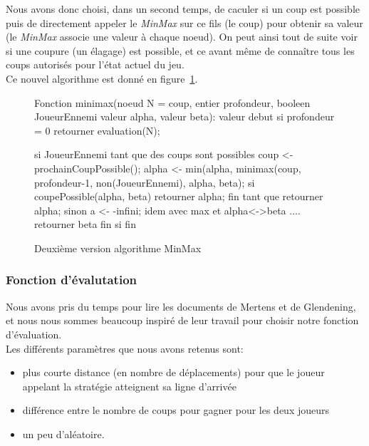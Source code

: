 \documentclass[12pt,a4paper]{article}
\begin{document}
Nous avons donc choisi, dans un second temps, de caculer si un coup est possible puis de directement appeler le 
\textit{MinMax} sur ce \og fils \fg{} (le coup) pour obtenir sa valeur (le \textit{MinMax} associe une 
valeur à chaque noeud). On peut ainsi tout de suite voir si une coupure (un élagage) 
est possible, et ce avant même de conna\^itre tous les coups autorisés pour l'état 
actuel du jeu. 
\\

Ce nouvel algorithme est donné en figure~\ref{algo2}.

\newpage
\begin{figure}[h]
\begin{verbatimtab}[2]
Fonction minimax(noeud N = coup, entier profondeur, booleen JoueurEnnemi
valeur alpha, valeur beta): valeur
debut
	si profondeur = 0
		retourner evaluation(N);

	si JoueurEnnemi
		tant que des coups sont possibles
			coup <- prochainCoupPossible();
			alpha <- min(alpha, minimax(coup, profondeur-1, non(JoueurEnnemi),
						alpha, beta);
			si coupePossible(alpha, beta)
				retourner alpha;
		fin tant que
		retourner alpha;
	sinon
		a <- -infini;
		idem avec max et alpha<->beta ....
		retourner beta
	fin si
fin
  \end{verbatimtab}
  \caption{Deuxième version algorithme MinMax}
  \label{algo2}
\end{figure}

\subsubsection{Fonction d'évalutation}

Nous avons pris du temps pour lire les documents de Mertens et de Glendening, et nous
nous sommes beaucoup inspiré de leur travail pour choisir notre fonction d'évaluation. 
\\
 
Les différents paramètres que nous avons retenus sont:
\begin{itemize}
  \item plus courte distance (en nombre de déplacements) pour que le joueur 
    appelant la stratégie atteignent sa ligne d'arrivée
  \item différence entre le nombre de coups pour gagner pour les deux joueurs
  \item un peu d'aléatoire.
\end{itemize}

\newpage 
\end{document}
